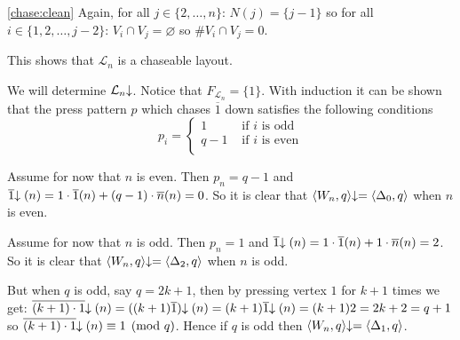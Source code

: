 \begin{example}
\begin{namedlist}
		\item[\ref{chase:clean}] Again, for all $j\in\{2,\ldots,n\}$:
		$N(j) = \{j-1\}$ so for all $i\in\{1,2,\ldots,j-2\}$: $V_{i}
		\cap V_{j} = \varnothing$ so $\#V_{i} \cap V_{j} = 0$.
	\end{namedlist}
	This shows that $\mathcal{L}_{n}$ is a chaseable layout.
	
	We will determine $\mathcal{L}_{n}\negthickspace\downarrow$. Notice that
	$F_{\mathcal{L}_{n}} = \{1\}$. With induction it can be shown that the
	press pattern $p$ which chases $\overline{1}$ down satisfies the
	following conditions 
	\[
		p_{i} = \left\{
		\begin{array}{ll}
			1   & \text{ if } i \text{ is odd} \\
			q-1 & \text{ if } i \text{ is even}\\
		\end{array}
		\right.
	\]
	
	Assume for now that $n$ is even. Then $p_{n}=q-1$ and
	$\overline{1}\negthickspace\downarrow(n) = 1\cdot\overline{1}(n) +
	(q-1)\cdot\overline{n}(n) = 0$. So it is clear that $\langle
	W_{n},q\rangle\negthickspace\downarrow = \langle\Delta_{0},q\rangle$ when $n$ is even.
	
	Assume for now that $n$ is odd. Then $p_{n}=1$ and $\overline{1}\negthickspace\downarrow(n) = 1\cdot\overline{1}(n) +
	1\cdot\overline{n}(n) = 2$. So it is clear that $\langle
	W_{n},q\rangle\negthickspace\downarrow = \langle\Delta_{2},q\rangle$ when $n$ is odd.
	
	But when $q$ is odd, say $q=2k+1$, then by pressing vertex $1$ for $k+1$
	times we get: $\overline{(k+1)\cdot 1}\negthickspace\downarrow(n) =
	((k+1)\overline{1})\negthickspace\downarrow(n) = (k+1)\overline{1}\negthickspace\downarrow(n) = (k+1) 2 = 2k+2
	= q + 1$ so $\overline{(k+1)\cdot 1}\negthickspace\downarrow(n) \equiv 1 \pmod q$. Hence if
	$q$ is odd then $\langle W_{n},q\rangle\negthickspace\downarrow =
	\langle\Delta_{1},q\rangle$.	
\end{example}
